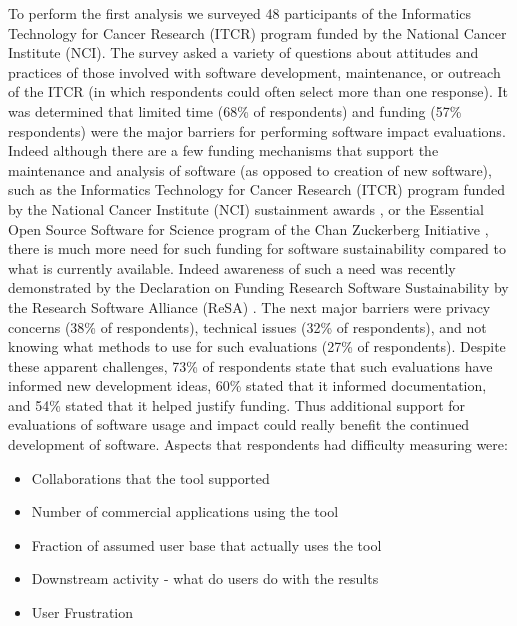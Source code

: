 \documentclass{article}
\begin{document}
To perform the first analysis we surveyed 48 participants of the Informatics Technology for Cancer Research (ITCR) program funded by the National Cancer Institute (NCI). The survey asked a variety of questions about attitudes and practices of those involved with software development, maintenance, or outreach of the ITCR (in which respondents could often select more than one response). It was determined that limited time (68\% of respondents) and funding (57\% respondents) were the major barriers for performing software impact evaluations. Indeed although there are a few funding mechanisms that support the maintenance and analysis of software (as opposed to creation of new software), such as the Informatics Technology for Cancer Research (ITCR) program funded by the National Cancer Institute (NCI) sustainment awards \cite{kibbe_cancer_2017, warner_informatics_2020}, or the Essential Open Source Software for Science program of the Chan Zuckerberg Initiative \cite{CZ_essential_2019}, there is much more need for such funding for software sustainability compared to what is currently available. Indeed awareness of such a need was recently demonstrated by the Declaration on Funding Research Software Sustainability by the Research Software Alliance (ReSA) \cite{barker_amsterdam_2023}. The next major barriers were privacy concerns (38\% of respondents), technical issues (32\% of respondents), and not knowing what methods to use for such evaluations (27\% of respondents). Despite these apparent challenges,  73\% of respondents state that such evaluations have informed new development ideas, 60\% stated that it informed documentation, and 54\% stated that it helped justify funding.  Thus additional support for evaluations of software usage and impact could really benefit the continued development of software. Aspects that respondents had difficulty measuring were:
\begin{itemize}
    \item Collaborations that the tool supported
    \item Number of commercial applications using the tool
    \item Fraction of assumed user base that actually uses the tool
    \item Downstream activity - what do users do with the results
    \item User Frustration
\end{itemize}
\end{document}
